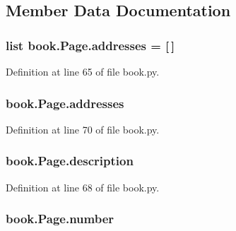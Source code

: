 \subsection{Member Data Documentation}
\subsubsection[{\texorpdfstring{addresses}{addresses}}]{\setlength{\rightskip}{0pt plus 5cm}list book.\+Page.\+addresses = \mbox{[}$\,$\mbox{]}\hspace{0.3cm}{\ttfamily [static]}}\hypertarget{classbook_1_1_page_a5355382812b7fdf00c0ca14fe65df271}{}\label{classbook_1_1_page_a5355382812b7fdf00c0ca14fe65df271}


Definition at line 65 of file book.\+py.

\subsubsection[{\texorpdfstring{addresses}{addresses}}]{\setlength{\rightskip}{0pt plus 5cm}book.\+Page.\+addresses}\hypertarget{classbook_1_1_page_a7e84efae20bbdabe92be054bcc95d2ac}{}\label{classbook_1_1_page_a7e84efae20bbdabe92be054bcc95d2ac}


Definition at line 70 of file book.\+py.

\subsubsection[{\texorpdfstring{description}{description}}]{\setlength{\rightskip}{0pt plus 5cm}book.\+Page.\+description}\hypertarget{classbook_1_1_page_a3215c3f1b982bf514ff90da13051596a}{}\label{classbook_1_1_page_a3215c3f1b982bf514ff90da13051596a}


Definition at line 68 of file book.\+py.

\subsubsection[{\texorpdfstring{number}{number}}]{\setlength{\rightskip}{0pt plus 5cm}book.\+Page.\+number}\hypertarget{classbook_1_1_page_aa05434b758c1957bbf56d2a8dbcf90c3}{}\label{classbook_1_1_page_aa05434b758c1957bbf56d2a8dbcf90c3}


